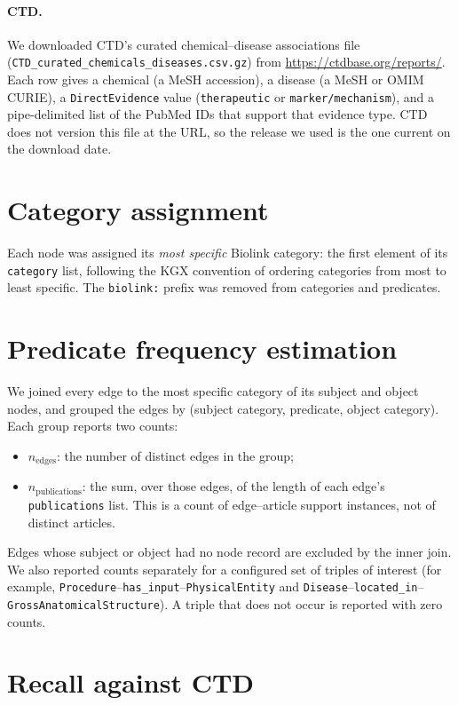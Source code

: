 \documentclass[11pt]{article}
\newcommand{\code}[1]{\texttt{#1}}
\newcommand{\pred}[1]{\texttt{#1}}
\begin{document}
\paragraph{CTD.}
We downloaded CTD's curated chemical--disease associations file
(\code{CTD\_curated\_chemicals\_diseases.csv.gz}) from
\url{https://ctdbase.org/reports/}. Each row gives a chemical (a MeSH
accession), a disease (a MeSH or OMIM CURIE), a \code{DirectEvidence} value
(\code{therapeutic} or \code{marker/mechanism}), and a pipe-delimited list of
the PubMed IDs that support that evidence type. CTD does not version this file
at the URL, so the release we used is the one current on the download date.

\section{Category assignment}

Each node was assigned its \emph{most specific} Biolink category: the first
element of its \code{category} list, following the KGX convention of ordering
categories from most to least specific. The \code{biolink:} prefix was removed
from categories and predicates.

\section{Predicate frequency estimation}

We joined every edge to the most specific category of its subject and object
nodes, and grouped the edges by
(subject category, predicate, object category). Each group reports two
counts:
\begin{itemize}[nosep]
  \item $n_{\text{edges}}$: the number of distinct edges in the group;
  \item $n_{\text{publications}}$: the sum, over those edges, of the length of
        each edge's \code{publications} list. This is a count of edge--article
        support instances, not of distinct articles.
\end{itemize}
Edges whose subject or object had no node record are excluded by the inner
join. We also reported counts separately for a configured set of triples of
interest (for example, \code{Procedure}--\pred{has\_input}--\code{PhysicalEntity}
and \code{Disease}--\pred{located\_in}--\code{GrossAnatomicalStructure}). A
triple that does not occur is reported with zero counts.

\section{Recall against CTD}
\end{document}
